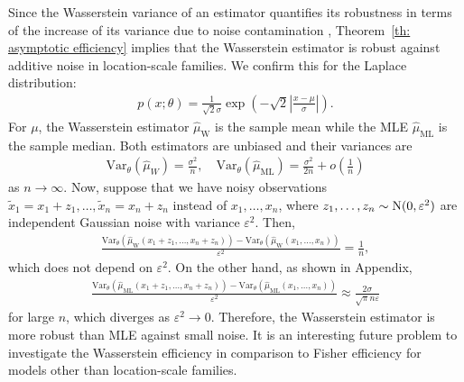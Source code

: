 \documentclass[11pt, a4paper]{article}
\begin{document}
Since the Wasserstein variance of an estimator quantifies its robustness in terms of the increase of its variance due to noise contamination \cite{affine}, Theorem~\ref{th: asymptotic efficiency} implies that the Wasserstein estimator is robust against additive noise in location-scale families.
We confirm this for the Laplace distribution:
\begin{align}\label{laplace}
	p(x;\theta) = \frac{1}{\sqrt{2}\sigma}\exp\left(-\sqrt{2}\left|\frac{x-\mu}{\sigma}\right|\right).
\end{align}
For $\mu$, the Wasserstein estimator $\hat{\mu}_{\mathrm{W}}$ is the sample mean while the MLE $\hat{\mu}_{\mathrm{ML}}$ is the sample median.
Both estimators are unbiased and their variances are 
\begin{align*}
	\mathrm{Var}_{\theta}(\hat{\mu}_{W}) = \frac{\sigma^2}{n}, \quad \mathrm{Var}_{\theta}(\hat{\mu}_{\mathrm{ML}}) = \frac{\sigma^2}{2n}+o \left( \frac{1}{n} \right)
\end{align*}
as $n \to \infty$.
Now, suppose that we have noisy observations $\tilde{x}_1=x_1+z_1,\dots,\tilde{x}_n=x_n+z_n$ instead of $x_1,\dots,x_n$, where $z_1,\dots,z_n \sim {\rm N}(0,\varepsilon^2)$ are independent Gaussian noise with variance $\varepsilon^2$.	
Then, 
\begin{align*}
	\frac{\mathrm{Var}_{\theta}(\hat{\mu}_{\mathrm{W}}(x_1+z_1,\dots,x_n+z_n))-\mathrm{Var}_{\theta}(\hat{\mu}_{\mathrm{W}}(x_1,\dots,x_n))}{\varepsilon^2} = \frac{1}{n},
\end{align*}
which does not depend on $\varepsilon^2$.
On the other hand, as shown in Appendix,
\begin{align}\label{laplace_W}
	\frac{\mathrm{Var}_{\theta}(\hat{\mu}_{\mathrm{ML}}(x_1+z_1,\dots,x_n+z_n))-\mathrm{Var}_{\theta}(\hat{\mu}_{\mathrm{ML}}(x_1,\dots,x_n))}{\varepsilon^2} \approx \frac{2 \sigma}{\sqrt{\pi} n \varepsilon}
\end{align} 
for large $n$, which diverges as $\varepsilon^2 \to 0$.
Therefore, the Wasserstein estimator is more robust than MLE against small noise.
It is an interesting future problem to investigate the Wasserstein efficiency in comparison to Fisher efficiency for models other than location-scale families.
\end{document}
